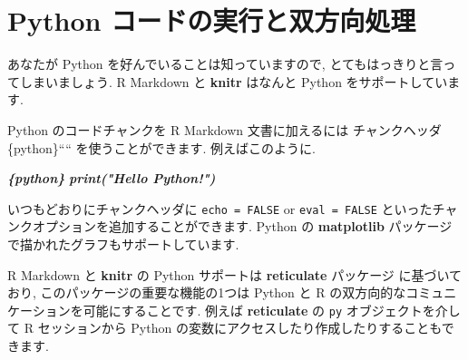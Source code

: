 \documentclass[
  11pt,
]{bxjsreport}
\newenvironment{Shaded}{\begin{snugshade}}{\end{snugshade}}
\newcommand{\InformationTok}[1]{\textcolor[rgb]{0.56,0.35,0.01}{\textbf{\textit{#1}}}}
\begin{document}
\hypertarget{eng-python}{%
\section{Python コードの実行と双方向処理}\label{eng-python}}

あなたが Python を好んでいることは知っていますので, とてもはっきりと言ってしまいましょう. R Markdown と \textbf{knitr} はなんと Python をサポートしています.

Python のコードチャンクを R Markdown 文書に加えるには チャンクヘッダ \texttt{}\{python\}```` を使うことができます. 例えばこのように.

\begin{Shaded}
\begin{Highlighting}[]
\InformationTok{\textasciigrave{}\textasciigrave{}\textasciigrave{}\{python\}}
\InformationTok{print("Hello Python!")}
\InformationTok{\textasciigrave{}\textasciigrave{}\textasciigrave{}}
\end{Highlighting}
\end{Shaded}

いつもどおりにチャンクヘッダに \texttt{echo = FALSE} or \texttt{eval = FALSE} といったチャンクオプションを追加することができます. Python の \textbf{matplotlib} パッケージで描かれたグラフもサポートしています.

R Markdown と \textbf{knitr} の Python サポートは \textbf{reticulate} パッケージ \autocite{R-reticulate} に基づいており, このパッケージの重要な機能の1つは Python と R の双方向的なコミュニケーションを可能にすることです. 例えば \textbf{reticulate} の \texttt{py} オブジェクトを介して R セッションから Python の変数にアクセスしたり作成したりすることもできます.
\end{document}

